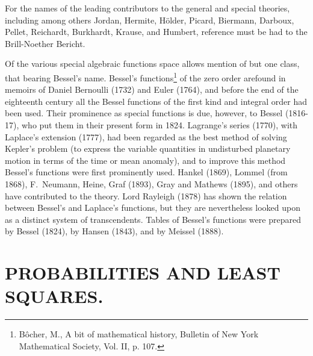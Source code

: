 \documentclass[oneside]{book}
\begin{document}
{For the names of the leading contributors to the general and special
theories, including among others Jordan, Hermite, H\"older, Picard,
Biermann, Darboux, Pellet, Reichardt, Burkhardt, Krause, and
Humbert, reference must be had to the Brill-Noether Bericht.

Of the various special algebraic functions space allows mention of
but one class, that bearing Bessel's name. Bessel's
functions\footnote{B\^ocher, M., A bit of mathematical history,
Bulletin of New York Mathematical Society, Vol. II, p. 107.} of
the zero order arefound in memoirs of Daniel Bernoulli (1732) and
Euler (1764), and before the end of the eighteenth century all the
Bessel functions of the first kind and integral order had been used.
Their prominence as special functions is due, however, to
Bessel (1816-17), who put them in their present form in 1824. Lagrange's
series (1770), with Laplace's extension (1777), had been regarded as the
best method of solving Kepler's problem (to express the variable quantities
in undisturbed planetary motion in terms of the time or mean anomaly),
and to improve this method Bessel's functions were first prominently
used. Hankel (1869), Lommel (from 1868), F.~Neumann, Heine, Graf
(1893), Gray and Mathews (1895), and others have contributed to the
theory. Lord Rayleigh (1878) has shown the relation between
Bessel's and Laplace's functions, but they are nevertheless looked
upon as a distinct system of transcendents. Tables of Bessel's
functions were prepared by Bessel (1824), by Hansen (1843), and by
Meissel (1888).

\chapter{PROBABILITIES AND LEAST SQUARES.}

}
\end{document}
